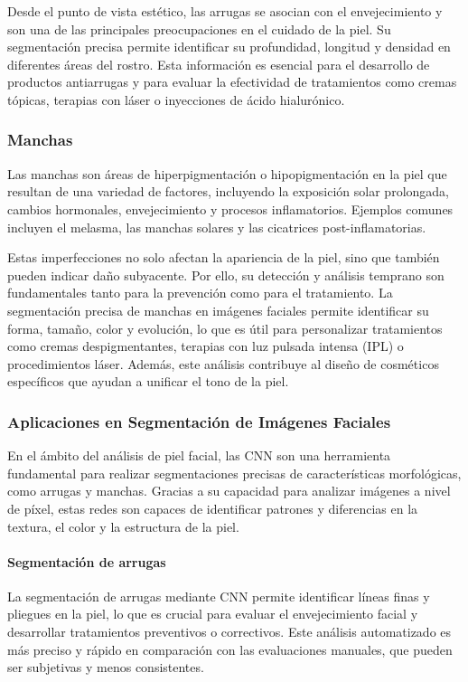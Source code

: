 Desde el punto de vista estético, las arrugas se asocian con el envejecimiento y son una de las principales preocupaciones en el cuidado de la piel. Su segmentación precisa permite identificar su profundidad, longitud y densidad en diferentes áreas del rostro. Esta información es esencial para el desarrollo de productos antiarrugas y para evaluar la efectividad de tratamientos como cremas tópicas, terapias con láser o inyecciones de ácido hialurónico. \parencite{autor2021arrugas}

\subsubsection{Manchas}
Las manchas son áreas de hiperpigmentación o hipopigmentación en la piel que resultan de una variedad de factores, incluyendo la exposición solar prolongada, cambios hormonales, envejecimiento y procesos inflamatorios. Ejemplos comunes incluyen el melasma, las manchas solares y las cicatrices post-inflamatorias. \parencite{autor2019manchas}

Estas imperfecciones no solo afectan la apariencia de la piel, sino que también pueden indicar daño subyacente. Por ello, su detección y análisis temprano son fundamentales tanto para la prevención como para el tratamiento. La segmentación precisa de manchas en imágenes faciales permite identificar su forma, tamaño, color y evolución, lo que es útil para personalizar tratamientos como cremas despigmentantes, terapias con luz pulsada intensa (IPL) o procedimientos láser. Además, este análisis contribuye al diseño de cosméticos específicos que ayudan a unificar el tono de la piel. \parencite{autor2019manchas}
\subsubsection{Aplicaciones en Segmentación de Imágenes Faciales}  
En el ámbito del análisis de piel facial, las CNN son una herramienta fundamental para realizar segmentaciones precisas de características morfológicas, como arrugas y manchas. Gracias a su capacidad para analizar imágenes a nivel de píxel, estas redes son capaces de identificar patrones y diferencias en la textura, el color y la estructura de la piel. \parencite{autor2021deeplab}

\paragraph{Segmentación de arrugas}  
La segmentación de arrugas mediante CNN permite identificar líneas finas y pliegues en la piel, lo que es crucial para evaluar el envejecimiento facial y desarrollar tratamientos preventivos o correctivos. Este análisis automatizado es más preciso y rápido en comparación con las evaluaciones manuales, que pueden ser subjetivas y menos consistentes. \parencite{autor2020segmentacion}

